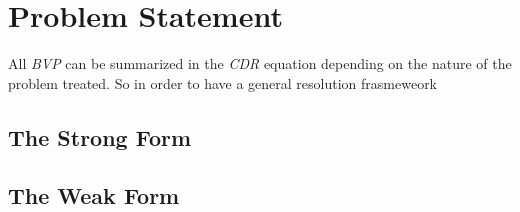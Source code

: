 \documentclass[../Dissertation]{subfiles}
\begin{document}
\section{Problem Statement}\label{sec:problem_statement}
  All \emph{BVP} can be summarized in the \emph{CDR} equation depending on the nature of the problem treated. So in order to have a general resolution frasmeweork 

  \lipsum[1-5]
  \subsection{The Strong Form}\label{subsec:strong_form}

  \subsection{The Weak Form}\label{subsec:weak_form}
\end{document}
